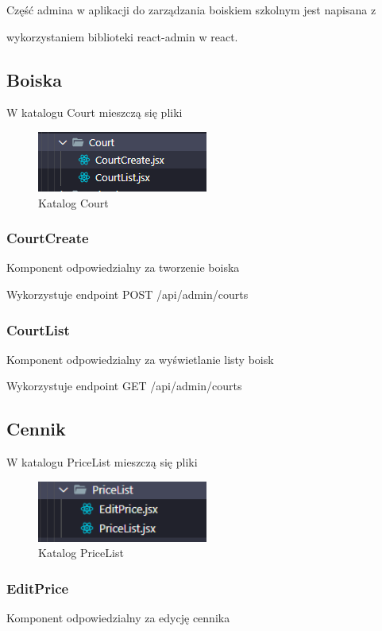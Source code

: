 \documentclass[titlepage]{article}
\begin{document}
\indent Część admina w aplikacji do zarządzania boiskiem szkolnym jest napisana z 

\newline
wykorzystaniem biblioteki react-admin w react.

\subsection{Boiska}
W katalogu Court mieszczą się pliki
\begin{figure}[h]
\centering
\includegraphics[width=0.5\textwidth]{court-admin.png}
\caption{Katalog Court}
\label{fig:obrazek Court}
\end{figure}
\subsubsection{CourtCreate}
Komponent odpowiedzialny za tworzenie boiska

\newline
Wykorzystuje endpoint POST /api/admin/courts
\subsubsection{CourtList}
Komponent odpowiedzialny za wyświetlanie listy boisk

\newline
Wykorzystuje endpoint GET /api/admin/courts

\subsection{Cennik}
W katalogu PriceList mieszczą się pliki

\begin{figure}[h]
\centering
\includegraphics[width=0.5\textwidth]{price-admin.png}
\caption{Katalog PriceList}
\label{fig:obrazek PriceList}
\end{figure}

\subsubsection{EditPrice}
Komponent odpowiedzialny za edycję cennika
\end{document}
